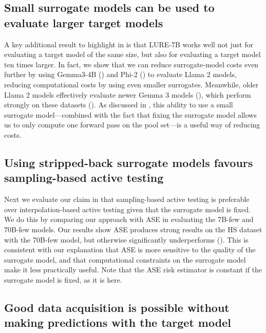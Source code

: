 



\subsection{Small surrogate models can be used to evaluate larger target models}

A key additional result to highlight in  is that LURE-7B works well not just for evaluating a target model of the same size, but also for evaluating a target model ten times larger.
In fact, we show that we can reduce surrogate-model costs even further by using Gemma3-4B () and Phi-2 () to evaluate Llama 2 models, reducing computational costs by using even smaller surrogates.
Meanwhile, older Llama 2 models effectively evaluate newer Gemma 3 models (), which perform strongly on these datasets ().
As discussed in , this ability to use a small surrogate model---combined with the fact that fixing the surrogate model allows us to only compute one forward pass on the pool set---is a useful way of reducing costs.


\subsection{Using stripped-back surrogate models favours sampling-based active testing}

Next we evaluate our claim in  that sampling-based active testing is preferable over interpolation-based active testing given that the surrogate model is fixed.
We do this by comparing our approach with ASE in evaluating the 7B-few and 70B-few models. 
Our results show ASE produces strong results on the HS dataset with the 70B-few model, but otherwise significantly underperforms ().
This is consistent with our explanation that ASE is more sensitive to the quality of the surrogate model, and that computational constraints on the surrogate model make it less practically useful.
Note that the ASE risk estimator is constant if the surrogate model is fixed, as it is here.


\subsection{Good data acquisition is possible without making predictions with the target model}\label{sec:entropy_acquisition}

